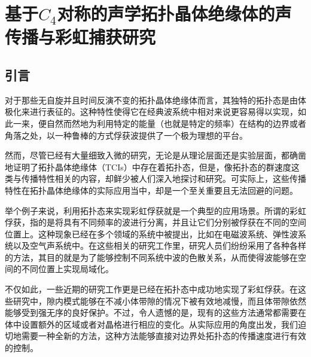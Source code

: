 \chapter{基于$C_4$对称的声学拓扑晶体绝缘体的声传播与彩虹捕获研究}
\section{引言}

对于那些无自旋并且时间反演不变的拓扑晶体绝缘体而言，其独特的拓扑态是由体极化来进行表征的。这种特性使得它在经典波系统中相对来说更容易得以实现，如此一来，便自然而然地为利用特定的能量（也就是特定的频率）在结构的边界或者角落之处，以一种鲁棒的方式俘获波提供了一个极为理想的平台。

然而，尽管已经有大量细致入微的研究，无论是从理论层面还是实验层面，都确凿地证明了拓扑晶体绝缘体（TCIs）中存在着拓扑态，但是，像拓扑态的群速度这类与传播特性相关的内容，却鲜少被人们深入地探讨和研究。可实际上，这些传播特性在拓扑晶体绝缘体的实际应用当中，却是一个至关重要且无法回避的问题。

举个例子来说，利用拓扑态来实现彩虹俘获就是一个典型的应用场景。所谓的彩虹俘获，指的是将具有不同频率的波进行分离，并且让它们分别被俘获在不同的空间位置上。这种现象已经在多个领域的系统中被提出，比如在电磁波系统\cite{C41-1,C41-2,C41-3,C41-4,C41-5,C41-6,C41-7,C41-8,C41-9}、弹性波系统\cite{C42-1,C42-2,C42-3,C42-4,C42-5,C42-6}以及空气声系统\cite{C43-1,C43-2,C43-3,C43-4}中。在这些相关的研究工作里，研究人员们纷纷采用了各种各样的方法，其目的就是为了能够控制不同系统中波的色散关系，从而使得波能够在空间的不同位置上实现局域化。

不仅如此，一些近期的研究工作更是已经在拓扑态中成功地实现了彩虹俘获\cite{C44-1,C44-2,C44-3,C44-4,C44-5,C44-6}。在这些研究中，隙内模式能够在不减小体带隙的情况下被有效地减慢，而且体带隙依然能够受到强无序的良好保护。不过，令人遗憾的是，现有的这些方法通常都需要在体中设置额外的区域或者对晶格进行相应的变化。从实际应用的角度出发，我们迫切地需要一种全新的方法，这种方法能够直接对边界处拓扑态的传播速度进行有效的控制。